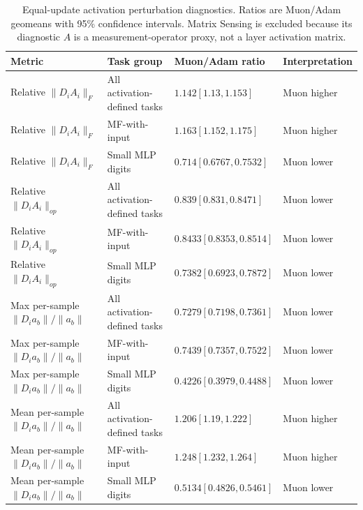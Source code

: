 \begin{table}[t]
\centering
\caption{Equal-update activation perturbation diagnostics. Ratios are Muon/Adam geomeans with 95\% confidence intervals. Matrix Sensing is excluded because its diagnostic $A$ is a measurement-operator proxy, not a layer activation matrix.}
\label{tab:e11-activation-perturbation}
\begin{tabular}{llll}
\toprule
Metric & Task group & Muon/Adam ratio & Interpretation \\
\midrule
Relative $\|D_iA_i\|_F$ & All activation-defined tasks & $1.142 [1.13, 1.153]$ & Muon higher \\
Relative $\|D_iA_i\|_F$ & MF-with-input & $1.163 [1.152, 1.175]$ & Muon higher \\
Relative $\|D_iA_i\|_F$ & Small MLP digits & $0.714 [0.6767, 0.7532]$ & Muon lower \\
Relative $\|D_iA_i\|_{op}$ & All activation-defined tasks & $0.839 [0.831, 0.8471]$ & Muon lower \\
Relative $\|D_iA_i\|_{op}$ & MF-with-input & $0.8433 [0.8353, 0.8514]$ & Muon lower \\
Relative $\|D_iA_i\|_{op}$ & Small MLP digits & $0.7382 [0.6923, 0.7872]$ & Muon lower \\
Max per-sample $\|D_ia_b\|/\|a_b\|$ & All activation-defined tasks & $0.7279 [0.7198, 0.7361]$ & Muon lower \\
Max per-sample $\|D_ia_b\|/\|a_b\|$ & MF-with-input & $0.7439 [0.7357, 0.7522]$ & Muon lower \\
Max per-sample $\|D_ia_b\|/\|a_b\|$ & Small MLP digits & $0.4226 [0.3979, 0.4488]$ & Muon lower \\
Mean per-sample $\|D_ia_b\|/\|a_b\|$ & All activation-defined tasks & $1.206 [1.19, 1.222]$ & Muon higher \\
Mean per-sample $\|D_ia_b\|/\|a_b\|$ & MF-with-input & $1.248 [1.232, 1.264]$ & Muon higher \\
Mean per-sample $\|D_ia_b\|/\|a_b\|$ & Small MLP digits & $0.5134 [0.4826, 0.5461]$ & Muon lower \\
\bottomrule
\end{tabular}
\end{table}
